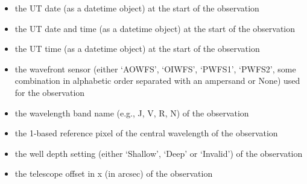 \documentclass[letterpaper,10pt,english]{sphinxmanual}
\begin{document}
\begin{itemize}
\item {} 
the UT date (as a datetime object) at the start of the observation

\end{itemize}

\begin{itemize}
\item {} 
the UT date and time (as a datetime object) at the start of the observation

\end{itemize}

\begin{itemize}
\item {} 
the UT time (as a datetime object) at the start of the observation

\end{itemize}

\begin{itemize}
\item {} 
the wavefront sensor (either `AOWFS', `OIWFS', `PWFS1', `PWFS2', some
combination in alphabetic order separated with an ampersand or None) used for
the observation

\end{itemize}

\begin{itemize}
\item {} 
the wavelength band name (e.g., J, V, R, N) of the observation

\end{itemize}

\begin{itemize}
\item {} 
the 1-based reference pixel of the central wavelength of the observation

\end{itemize}

\begin{itemize}
\item {} 
the well depth setting (either `Shallow', `Deep' or `Invalid') of the
observation

\end{itemize}

\begin{itemize}
\item {} 
the telescope offset in x (in arcsec) of the observation

\end{itemize}
\end{document}
